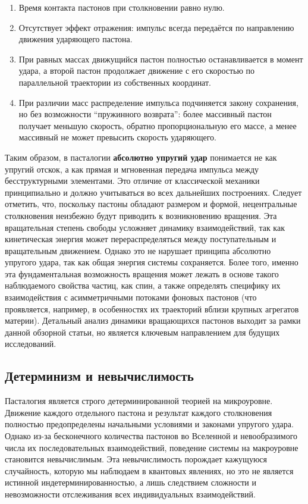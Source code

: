 \documentclass[pdflatex,sn-mathphys-num]{sn-jnl}
\begin{document}
\begin{enumerate}
  \item Время контакта пастонов при столкновении равно нулю.
  \item Отсутствует эффект отражения: импульс всегда передаётся по направлению движения ударяющего пастона.
  \item При равных массах движущийся пастон полностью останавливается в момент удара, а второй пастон продолжает движение с его скоростью по параллельной траектории из собственных координат.
  \item При различии масс распределение импульса подчиняется закону сохранения, но без возможности ``пружинного возврата'': более массивный пастон получает меньшую скорость, обратно пропорциональную его массе, а менее массивный не может превысить скорость ударяющего.
\end{enumerate}

Таким образом, в пасталогии \textbf{абсолютно упругий удар} понимается не как упругий отскок, а как прямая и мгновенная передача импульса между бесструктурными элементами. Это отличие от классической механики принципиально и должно учитываться во всех дальнейших построениях. Следует отметить, что, поскольку пастоны обладают размером и формой, нецентральные столкновения неизбежно будут приводить к возникновению вращения. Эта вращательная степень свободы усложняет динамику взаимодействий, так как кинетическая энергия может перераспределяться между поступательным и вращательным движением. Однако это не нарушает принципа абсолютно упругого удара, так как общая энергия системы сохраняется. Более того, именно эта фундаментальная возможность вращения может лежать в основе такого наблюдаемого свойства частиц, как спин, а также определять специфику их взаимодействия с асимметричными потоками фоновых пастонов (что проявляется, например, в особенностях их траекторий вблизи крупных агрегатов материи). Детальный анализ динамики вращающихся пастонов выходит за рамки данной обзорной статьи, но является ключевым направлением для будущих исследований.

\subsection{Детерминизм и невычислимость}\label{subsec:determinism}

Пасталогия является строго детерминированной теорией на микроуровне. Движение каждого отдельного пастона и результат каждого столкновения полностью предопределены начальными условиями и законами упругого удара. Однако из-за бесконечного количества пастонов во Вселенной и невообразимого числа их последовательных взаимодействий, поведение системы на макроуровне становится невычислимым. Эта невычислимость порождает кажущуюся случайность, которую мы наблюдаем в квантовых явлениях, но это не является истинной индетерминированностью, а лишь следствием сложности и невозможности отслеживания всех индивидуальных взаимодействий.
\end{document}
